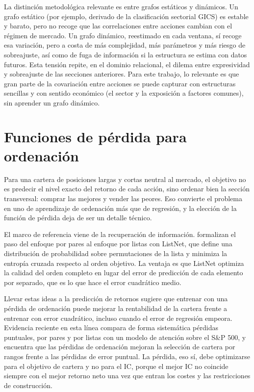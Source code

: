 La distinción metodológica relevante es entre grafos estáticos y dinámicos. Un grafo
estático (por ejemplo, derivado de la clasificación sectorial GICS) es estable y barato,
pero no recoge que las correlaciones entre acciones cambian con el régimen de mercado. Un
grafo dinámico, reestimado en cada ventana, sí recoge esa variación, pero a costa de más
complejidad, más parámetros y más riesgo de sobreajuste, así como de fuga de información
si la estructura se estima con datos futuros. Esta tensión repite, en el dominio
relacional, el dilema entre expresividad y sobreajuste de las secciones anteriores. Para
este trabajo, lo relevante es que gran parte de la covariación entre acciones se puede
capturar con estructuras sencillas y con sentido económico (el sector y la exposición a
factores comunes), sin aprender un grafo dinámico.

\section{Funciones de pérdida para ordenación}

Para una cartera de posiciones largas y cortas neutral al mercado, el objetivo no es
predecir el nivel exacto del retorno de cada acción, sino ordenar bien la sección
transversal: comprar las mejores y vender las peores. Eso convierte el problema en uno de
aprendizaje de ordenación más que de regresión, y la elección de la función de pérdida
deja de ser un detalle técnico.

El marco de referencia viene de la recuperación de información. \textcite{cao2007learning}
formalizan el paso del enfoque por pares al enfoque por listas con ListNet, que define una
distribución de probabilidad sobre permutaciones de la lista y minimiza la entropía
cruzada respecto al orden objetivo. La ventaja es que ListNet optimiza la calidad del
orden completo en lugar del error de predicción de cada elemento por separado, que es lo
que hace el error cuadrático medio.

Llevar estas ideas a la predicción de retornos sugiere que entrenar con una pérdida de
ordenación puede mejorar la rentabilidad de la cartera frente a entrenar con error
cuadrático, incluso cuando el error de regresión empeora. Evidencia reciente en esta línea
\autocite{ranking2025loss} compara de forma sistemática pérdidas puntuales, por pares y
por listas con un modelo de atención sobre el S\&P 500, y encuentra que las pérdidas de
ordenación mejoran la selección de cartera por rangos frente a las pérdidas de error
puntual. La pérdida, eso sí, debe optimizarse para el objetivo de cartera y no para el IC,
porque el mejor IC no coincide siempre con el mejor retorno neto una vez que entran los
costes y las restricciones de construcción.

